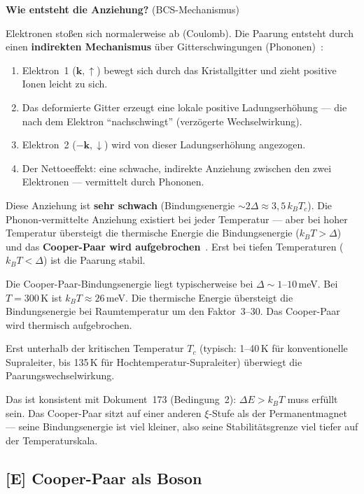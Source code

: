 \textbf{Wie entsteht die Anziehung?} (BCS-Mechanismus)

Elektronen stoßen sich normalerweise ab (Coulomb).
Die Paarung entsteht durch einen \textbf{indirekten Mechanismus}
über Gitterschwingungen (Phononen)~\cite{BCS1957}:

\begin{enumerate}
  \item Elektron~1 ($\mathbf{k},\uparrow$) bewegt sich durch
    das Kristallgitter und zieht positive Ionen leicht zu sich.
  \item Das deformierte Gitter erzeugt eine lokale
    positive Ladungserhöhung --- die nach dem Elektron
    ``nachschwingt'' (verzögerte Wechselwirkung).
  \item Elektron~2 ($-\mathbf{k},\downarrow$) wird von
    dieser Ladungserhöhung angezogen.
  \item Der Nettoeeffekt: eine schwache, indirekte Anziehung
    zwischen den zwei Elektronen --- vermittelt durch Phononen.
\end{enumerate}

Diese Anziehung ist \textbf{sehr schwach} (Bindungsenergie
$\sim 2\Delta \approx 3{,}5\,k_BT_c$).
Die Phonon-vermittelte Anziehung existiert bei jeder Temperatur ---
aber bei hoher Temperatur übersteigt die thermische Energie
die Bindungsenergie ($k_BT > \Delta$) und das
\textbf{Cooper-Paar wird aufgebrochen}~\cite{BCS1957}.
Erst bei tiefen Temperaturen ($k_BT < \Delta$) ist
die Paarung stabil.

\begin{important}
Die Cooper-Paar-Bindungsenergie liegt typischerweise
bei $\Delta \sim 1$--$10$\,meV.
Bei $T = 300$\,K ist $k_BT \approx 26$\,meV.
Die thermische Energie übersteigt die Bindungsenergie
bei Raumtemperatur um den Faktor~3--30.
Das Cooper-Paar wird thermisch aufgebrochen.

Erst unterhalb der kritischen Temperatur $T_c$
(typisch: 1--40\,K für konventionelle Supraleiter,
bis 135\,K für Hochtemperatur-Supraleiter)
überwiegt die Paarungswechselwirkung.

Das ist konsistent mit Dokument~173 (Bedingung~2):
$\Delta E > k_BT$ muss erfüllt sein.
Das Cooper-Paar sitzt auf einer anderen $\xi$-Stufe
als der Permanentmagnet --- seine Bindungsenergie
ist viel kleiner, also seine Stabilitätsgrenze
viel tiefer auf der Temperaturskala.
\end{important}

\subsection{[E] Cooper-Paar als Boson}

